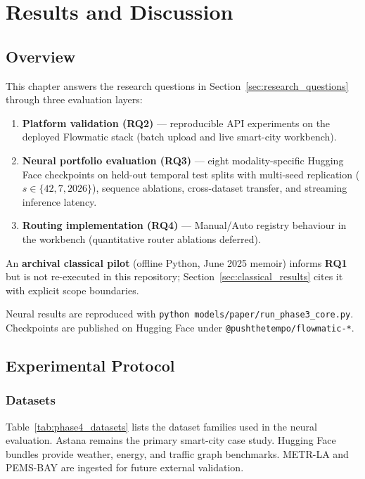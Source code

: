 %
%

\chapter{Results and Discussion}
\label{chap:results}

\section{Overview}
\label{sec:exp_overview}

This chapter answers the research questions in Section~\ref{sec:research_questions} through three evaluation layers:
\begin{enumerate}
  \item \textbf{Platform validation (RQ2)} --- reproducible API experiments on the deployed Flowmatic stack (batch upload and live smart-city workbench).
  \item \textbf{Neural portfolio evaluation (RQ3)} --- eight modality-specific Hugging Face checkpoints on held-out temporal test splits with multi-seed replication ($s\in\{42,7,2026\}$), sequence ablations, cross-dataset transfer, and streaming inference latency.
  \item \textbf{Routing implementation (RQ4)} --- Manual/Auto registry behaviour in the workbench (quantitative router ablations deferred).
\end{enumerate}

An \textbf{archival classical pilot} (offline Python, June 2025 memoir) informs \textbf{RQ1} but is not re-executed in this repository; Section~\ref{sec:classical_results} cites it with explicit scope boundaries.

Neural results are reproduced with \texttt{python models/paper/run\_phase3\_core.py}. Checkpoints are published on Hugging Face under \texttt{@pushthetempo/flowmatic-*}.

\section{Experimental Protocol}
\label{sec:exp_protocol}

\subsection{Datasets}

Table~\ref{tab:phase4_datasets} lists the dataset families used in the neural evaluation. Astana remains the primary smart-city case study. Hugging Face bundles provide weather, energy, and traffic graph benchmarks. METR-LA and PEMS-BAY are ingested for future external validation.

